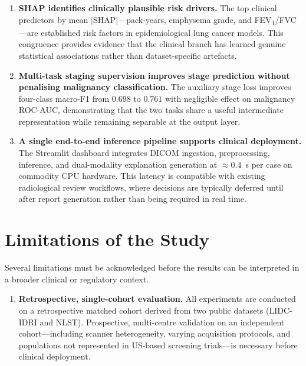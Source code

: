 {\begin{enumerate}
    \item \textbf{SHAP identifies clinically plausible risk drivers.}
    The top clinical predictors by mean $|\text{SHAP}|$---pack-years, emphysema grade,
    and FEV\textsubscript{1}/FVC---are established risk factors in epidemiological lung
    cancer models. This congruence provides evidence that the clinical branch has
    learned genuine statistical associations rather than dataset-specific artefacts.

    \item \textbf{Multi-task staging supervision improves stage prediction without
    penalising malignancy classification.}
    The auxiliary stage loss improves four-class macro-F1 from $0.698$ to $0.761$
    with negligible effect on malignancy ROC-AUC, demonstrating that the two tasks
    share a useful intermediate representation while remaining separable at the output
    layer.

    \item \textbf{A single end-to-end inference pipeline supports clinical deployment.}
    The Streamlit dashboard integrates DICOM ingestion, preprocessing, inference, and
    dual-modality explanation generation at $\approx 0.4$~s per case on commodity CPU
    hardware. This latency is compatible with existing radiological review workflows,
    where decisions are typically deferred until after report generation rather than
    being required in real time.

\end{enumerate}


\section{Limitations of the Study}
\label{sec:limitations}

Several limitations must be acknowledged before the results can be interpreted in a
broader clinical or regulatory context.

\begin{enumerate}

    \item \textbf{Retrospective, single-cohort evaluation.}
    All experiments are conducted on a retrospective matched cohort derived from two
    public datasets (LIDC-IDRI and NLST). Prospective, multi-centre validation on an
    independent cohort---including scanner heterogeneity, varying acquisition protocols,
    and populations not represented in US-based screening trials---is necessary before
    clinical deployment.


\end{enumerate}}

